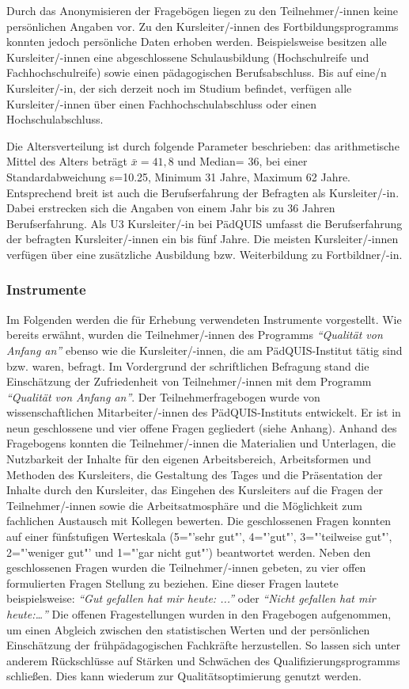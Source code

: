 \documentclass[12pt,a4paper]{article}
\begin{document}
Durch das Anonymisieren der Fragebögen liegen zu den Teilnehmer/-innen keine persönlichen Angaben vor. Zu den Kursleiter/-innen des Fortbildungsprogramms konnten jedoch persönliche Daten erhoben werden. Beispielsweise besitzen alle Kursleiter/-innen eine abgeschlossene Schulausbildung (Hochschulreife und Fachhochschulreife) so\-wie einen pädagogischen Berufsabschluss. Bis auf eine/n Kursleiter/-in, der sich derzeit noch im Studium befindet, verfügen alle Kursleiter/-innen über einen Fachhochschulabschluss oder einen Hochschulabschluss. 

Die Al\-ters\-ver\-teil\-ung ist durch folgende Parameter beschrieben: das arithmetische Mittel des Alters beträgt $\bar x= 41,8$ und Median= 36, bei einer Standardabweichung s=10.25, Minimum 31 Jahre, Maximum 62 Jahre. Entsprechend breit ist auch die Berufserfahrung der Befragten als Kursleiter/-in. Dabei erstrecken sich die Angaben von einem Jahr bis zu 36 Jahren Berufserfahrung. Als U3 Kursleiter/-in bei PädQUIS umfasst die Berufserfahrung der befragten Kursleiter/-innen ein bis fünf Jahre. Die meisten Kursleiter/-innen verfügen über eine zusätzliche Ausbildung bzw. Weiterbildung zu Fortbildner/-in.

\subsubsection{Instrumente}

Im Folgenden werden die für Erhebung verwendeten Instrumente vorgestellt. Wie bereits erwähnt, wurden die Teilnehmer/-innen des Programms \textit{"`Qualität von Anfang an"'} ebenso wie die Kursleiter/-innen, die am PädQUIS-Institut tätig sind bzw. waren, befragt. Im Vordergrund der schriftlichen Befragung stand die Einschätzung der Zufriedenheit von Teilnehmer/-innen mit dem Programm \textit{"`Qualität von Anfang an"'}. Der Teilnehmerfragebogen wurde von wissenschaftlichen Mitarbeiter/-innen des PädQUIS-Instituts entwickelt. Er ist in neun geschlossene und vier offene Fragen  gegliedert (siehe Anhang).
Anhand des Fragebogens konnten die Teilnehmer/-innen die Materialien und Unterlagen, die Nutzbarkeit der Inhalte für den eigenen Arbeitsbereich, Arbeitsformen und Methoden des Kursleiters, die Gestaltung des Tages und die Präsentation der Inhalte durch den Kursleiter, das Eingehen des Kursleiters auf die Fragen der Teilnehmer/-innen sowie die Arbeitsatmosphäre und die Möglichkeit zum fachlichen Austausch mit Kollegen bewerten. Die geschlossenen Fragen konnten auf einer fünfstufigen Werteskala (5="'sehr gut"', 4="'gut"', 3="'teilweise gut"', 2="'weniger gut"' und 1="'gar nicht gut"') beantwortet werden. Neben den geschlossenen Fragen wurden die Teilnehmer/-innen gebeten, zu vier offen formulierten Fragen Stellung zu beziehen. Eine dieser Fragen lautete beispielsweise: \textit{"`Gut gefallen hat mir heute: ..."'} oder \textit{"`Nicht gefallen hat mir heute:…"'} Die offenen Fragestellungen wurden in den Fragebogen aufgenommen, um einen Abgleich zwischen den statistischen Werten und der persönlichen Einschätzung der frühpädagogischen Fachkräfte herzustellen. So lassen sich unter anderem Rückschlüsse auf Stärken und Schwächen des Qualifizierungsprogramms schließen. Dies kann wiederum zur Qualitätsoptimierung genutzt werden.
\end{document}
